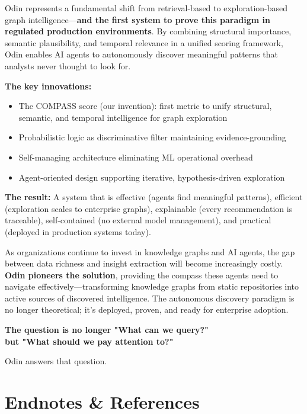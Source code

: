 \documentclass[11pt]{article}
\begin{document}
Odin represents a fundamental shift from retrieval-based to exploration-based graph intelligence—\textbf{and the first system to prove this paradigm in regulated production environments}. By combining structural importance, semantic plausibility, and temporal relevance in a unified scoring framework, Odin enables AI agents to autonomously discover meaningful patterns that analysts never thought to look for.

\textbf{The key innovations:}
\begin{itemize}
\item The COMPASS score (our invention): first metric to unify structural, semantic, and temporal intelligence for graph exploration
\item Probabilistic logic as discriminative filter maintaining evidence-grounding
\item Self-managing architecture eliminating ML operational overhead
\item Agent-oriented design supporting iterative, hypothesis-driven exploration
\end{itemize}

\textbf{The result:} A system that is effective (agents find meaningful patterns), efficient (exploration scales to enterprise graphs), explainable (every recommendation is traceable), self-contained (no external model management), and practical (deployed in production systems today).

As organizations continue to invest in knowledge graphs and AI agents, the gap between data richness and insight extraction will become increasingly costly. \textbf{Odin pioneers the solution}, providing the compass these agents need to navigate effectively—transforming knowledge graphs from static repositories into active sources of discovered intelligence. The autonomous discovery paradigm is no longer theoretical; it's deployed, proven, and ready for enterprise adoption.

\begin{center}
\Large\textbf{The question is no longer "What can we query?"\\but "What should we pay attention to?"}

\vspace{0.5cm}
\normalsize Odin answers that question.
\end{center}

\vfill
\pagebreak

\section*{Endnotes \& References}
\end{document}
